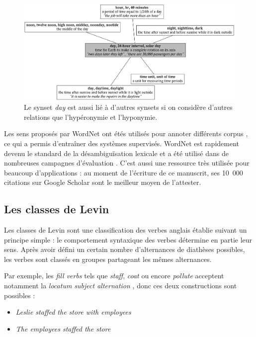 \begin{figure}
    \centering
    \includegraphics[width=\textwidth]{fig/wordnet_relations.png}
    \caption{\label{fig:wordnet_relations} Le synset \textit{day} est aussi lié à
        d'autres synsets si on considère d'autres relations que l'hypéronymie et
        l'hyponymie.}
\end{figure}

Les sens proposés par WordNet ont étés utilisés pour annoter différents corpus
\citep{petrolito2014survey}, ce qui a permis d'entraîner des systèmes
supervisés. WordNet est rapidement devenu le standard de la désambiguïsation
lexicale et a été utilisé dans de nombreuses campagnes d'évaluation
\citep{navigli2009word}. C'est aussi une ressource très utilisée pour beaucoup
d'applications : au moment de l'écriture de ce manuscrit, ses 10~000 citations
sur Google Scholar sont le meilleur moyen de l'attester.

\subsection{Les classes de Levin}
\label{presentation_levin}

Les classes de Levin \citep{levin1993english} sont une classification des
verbes anglais établie suivant un principe simple : le comportement syntaxique
des verbes détermine en partie leur sens. Après avoir défini un certain nombre
d'alternances de diathèses possibles, les verbes sont classés en groupes
partageant les mêmes alternances.

Par exemple, les \textit{fill verbs} tels que \textit{staff}, \textit{coat} ou encore
\textit{pollute} \citep[p.~119]{levin1993english} acceptent notamment la
\textit{locatum subject alternation} \citep[p.~85]{levin1993english}, donc ces
deux constructions sont possibles :

\begin{itemize}
    \item \textit{Leslie staffed the store with employees}
    \item \textit{The employees staffed the store}
\end{itemize}


